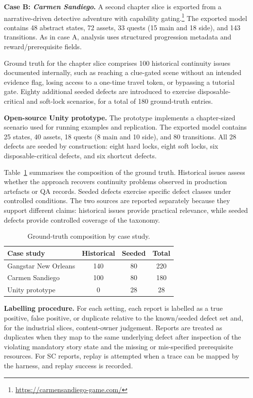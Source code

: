 \documentclass[conference]{IEEEtran}
\begin{document}
\noindent\textbf{Case B: \emph{Carmen Sandiego}.}
A second chapter slice is exported from a narrative-driven detective
adventure with capability gating.\footnote{\url{https://carmensandiego-game.com/}}
The exported model contains 48 abstract states, 72 assets, 33 quests
(15 main and 18 side), and 143 transitions. As in case A, analysis uses
structured progression metadata and reward/prerequisite fields.

Ground truth for the chapter slice comprises 100 historical continuity
issues documented internally, such as reaching a clue-gated scene without an intended evidence flag, losing access to a one-time travel token, or
bypassing a tutorial gate. Eighty additional seeded defects are
introduced to exercise disposable-critical and soft-lock scenarios, for a
total of 180 ground-truth entries.

\noindent\textbf{Open-source Unity prototype.}
The prototype implements a chapter-sized scenario used for running
examples and replication. The exported model contains 25 states, 40
assets, 18 quests (8 main and 10 side), and 80 transitions. All 28 defects are seeded by construction: eight hard locks, eight soft
locks, six disposable-critical defects, and six shortcut defects.

Table~\ref{tab:ground-truth-composition} summarises the composition of
the ground truth. Historical issues assess whether the approach recovers
continuity problems observed in production artefacts or QA records.
Seeded defects exercise specific defect classes under controlled
conditions. The two sources are reported separately because they support
different claims: historical issues provide practical relevance, while seeded defects provide controlled coverage of the taxonomy.

\begin{table}[t]
  \caption{Ground-truth composition by case study.}
  \label{tab:ground-truth-composition}
  \centering
  \begin{tabular}{lccc}
    \toprule
    Case study & Historical & Seeded & Total \\
    \midrule
    Gangstar New Orleans & 140 & 80  & 220 \\
    Carmen Sandiego      & 100 & 80  & 180 \\
    Unity prototype      & 0   & 28  & 28  \\
    \bottomrule
  \end{tabular}
\end{table}

\noindent\textbf{Labelling procedure.}
For each setting, each report is labelled as a true positive,
false positive, or duplicate relative to the known/seeded defect set and,
for the industrial slices, content-owner judgement. Reports are treated
as duplicates when they map to the same underlying defect after
inspection of the violating mandatory story state and the missing or
mis-specified prerequisite resources. For SC reports, replay is attempted
when a trace can be mapped by the harness, and replay success is
recorded.
\end{document}
